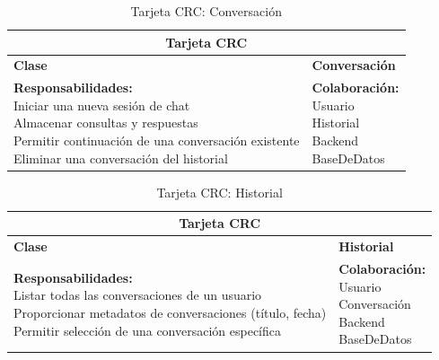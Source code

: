 \begin{addendum}
		\begin{longtable}{|l|l|}
			\caption{Tarjeta CRC: Conversación} \label{tablacrc8} \\
			\hline
			\multicolumn{2}{|c|}{\textbf{Tarjeta CRC}} \\
			\hline
			\textbf{Clase} & \textbf{Conversación} \\
			\hline
			\parbox[t]{0.45\linewidth}{\textbf{Responsabilidades:} \\ 
				Iniciar una nueva sesión de chat \\ 
				Almacenar consultas y respuestas \\ 
				Permitir continuación de una conversación existente \\ 
				Eliminar una conversación del historial} 
			& 
			\parbox[t]{0.45\linewidth}{\textbf{Colaboración:} \\ 
				Usuario \\ 
				Historial \\ 
				Backend \\ 
				BaseDeDatos} \\
			\hline
		\end{longtable}
		
		\begin{longtable}{|l|l|}
			\caption{Tarjeta CRC: Historial} \label{tablacrc9} \\
			\hline
			\multicolumn{2}{|c|}{\textbf{Tarjeta CRC}} \\
			\hline
			\textbf{Clase} & \textbf{Historial} \\
			\hline
			\parbox[t]{0.45\linewidth}{\textbf{Responsabilidades:} \\ 
				Listar todas las conversaciones de un usuario \\ 
				Proporcionar metadatos de conversaciones (título, fecha) \\ 
				Permitir selección de una conversación específica} 
			& 
			\parbox[t]{0.45\linewidth}{\textbf{Colaboración:} \\ 
				Usuario \\ 
				Conversación \\ 
				Backend \\ 
				BaseDeDatos} \\
			\hline
		\end{longtable}
		

\end{addendum}
